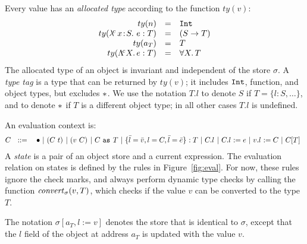 \documentclass{article}
\newcommand{\fun}[1]{\mbox{\it #1\/}}
\newcommand{\safe}{\bullet}
\newcommand{\lam}[5]{\lambda\!^{#1}\,#2\!:\!#3.\,\,#5:#4}
\newcommand{\lamt}[2]{#1\rightarrow #2}
\newcommand{\app}[3]{(#2~#3)^{#1}}
\newcommand{\Int}{\t{Int}}
\newcommand{\Bool}{\t{Bool}}
\newcommand{\dynamic}{\t{*}}
\newcommand{\hole}{\safe}
\newcommand{\Lam}[4]{\Lambda\!^{#1} #2.\,#3:#4}
\newcommand{\App}[2]{#1[#2]}
\newcommand{\Forall}[2]{\forall #1.\,#2}
\newcommand{\cast}[3]{#2~\t{as}^{#1}~#3}
\newcommand{\convert}[2]{{#1}\convertword{#2}}
\newcommand{\convertword}{\mbox{\,\,$\sim :$\,\,}}
\renewcommand{\t}[1]{{\tt #1}}
\newcommand{\objty}[1]{\{#1\}}
\newcommand{\obje}[3]{\{#2\}^{#1}:{#3}}
\newcommand{\objget}[3]{#2.#3^{#1}}
\newcommand{\objset}[4]{#2.#3^{#1}:=#4}
\newcommand{\wrap}[2]{#1~\t{wrap}~#2}
\newcommand{\allocty}[1]{ty(#1)}
\renewcommand{\convert}[2]{\fun{convert}_{\sigma}(#1,#2)}
\begin{document}
Every value has an \emph{allocated type} according to the function $\allocty{v}$:
\[
\begin{array}{rcll}
		\allocty{n}&=&\Int \\
		\allocty{\lam{c}{x}{S}{T}{e}}&=&(\lamt{S}{T})\\
		\allocty{a_T}&=&T   \\
		\allocty{\Lam c X e T} &=& \Forall X T
\end{array}
\]
The allocated type of an object is invariant and independent of the store $\sigma$. 
A \emph{type tag} is a type that can be returned by $\allocty{v}$; it includes $\Int$, function, and object types, but excludes $\dynamic$. 
We use the notation $T.l$ to denote $S$ if $T=\objty{l:S,\dots}$, and to denote $\dynamic$ if $T$ is a different object type; in all other cases $T.l$ is undefined.

An evaluation context is:
\[
C ~~::=
\begin{array}[t]{@{}l}
		~~~\hole
	~|~	\app{}{C}{t} 
	~|~	\app{}{v}{C}
	~|~ \cast{}{C}{T} 
	~|~ \obje{}{\bar l=\bar v,l=C, \bar l =\bar e}{T}
	~|~ \objget{}{C}{l}
	~|~ \objset{}{C}{l}{e}
	~|~ \objset{}{v}{l}{C} 
	~|~ \App{C}{T}
\end{array}
\]
A \emph{state} is a pair of an object store and a current expression.
The evaluation relation on states is defined by the rules in Figure~\ref{fig:eval}.
For now, these rules ignore the check marks, and always perform dynamic type checks by calling the function $\convert{v}{T}$, which checks if the value $v$ can be converted to the type $T$. 

The notation $\sigma[a_T,l:=v]$ denotes the store that is identical to $\sigma$, except that the $l$ field of the object at address $a_T$ is updated with the value $v$.
\end{document}
